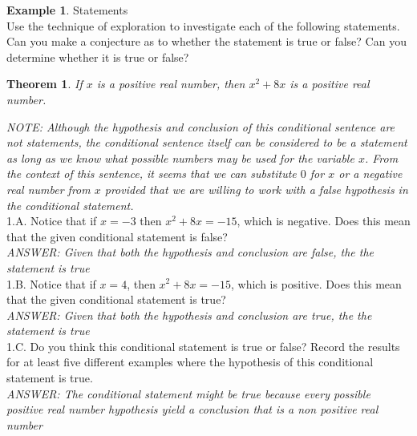 \documentclass{book}
\newtheorem{theorem}{Theorem}[section]
\theoremstyle{definition}
\newtheorem{example}{Example}[definition]
\theoremstyle{remark}
\begin{document}
\begin{example}
Statements \cite[Chap.1, P.C.1.4, Q.1]{ted} \\

Use the technique of exploration to investigate each of the following statements. Can you make a conjecture as to whether the statement is true or false? Can you determine whether it is true or false? \\

\begin{tcolorbox}
    \begin{theorem}
        If $x$ is a positive real number, then $x^2 + 8x$ is a positive real number.
    \end{theorem}
\end{tcolorbox}

{\it NOTE: Although the hypothesis and conclusion of this conditional sentence are not statements, the conditional sentence itself can be considered to be a statement as long as we know what possible numbers may be used for the variable $x$. From the context of this sentence, it seems that we can substitute $0$ for $x$ or a negative real number from $x$ provided that we are willing to work with a false hypothesis in the conditional statement.} \\

1.A. Notice that  if $x=-3$ then $x^2 + 8x = -15$, which is negative. Does this mean that the given conditional statement is false? \\
{\it ANSWER: Given that both the hypothesis and conclusion are false, the the statement is true} \\

1.B. Notice that if $x=4$, then $x^2 + 8x = -15$, which is positive. Does this mean that the given conditional statement is true? \\
{\it ANSWER: Given that both the hypothesis and conclusion are true, the the statement is true} \\

1.C. Do you think this conditional statement is true or false? Record the results for at least five different examples where the hypothesis of this conditional statement is true. \\
{\it ANSWER: The conditional statement might be true because every possible positive real number hypothesis yield a conclusion that is a non positive real number } \\
\end{example}
\end{document}
